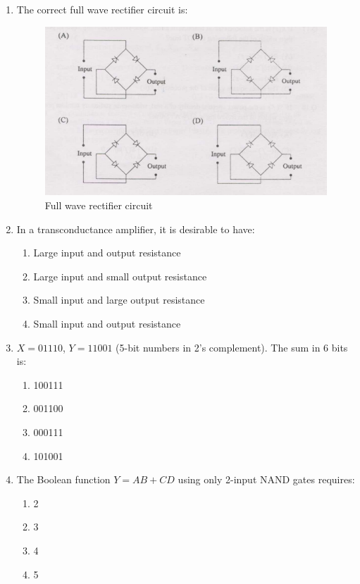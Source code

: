 \documentclass[journal,12pt,onecolumn]{IEEEtran}
\theoremstyle{remark}
\begin{document}
\begin{enumerate}
\item The correct full wave rectifier circuit is: 
\hfill{}

\begin{figure}[H]
    \centering
    \includegraphics[width=0.8\linewidth]{Q11.png}
    \caption{Full wave rectifier circuit}
    \label{fig:full_wave}
\end{figure}

\item In a transconductance amplifier, it is desirable to have: 
\hfill{}
\begin{enumerate}
    \item Large input and output resistance
    \item Large input and small output resistance
    \item Small input and large output resistance
    \item Small input and output resistance
\end{enumerate}

\item $ X = 01110 $, $ Y = 11001 $ (5-bit numbers in 2's complement). The sum in 6 bits is: 
\hfill{}
\begin{multicols}{4}

\begin{enumerate}
    \item 100111
    \item 001100
    \item 000111
    \item 101001
\end{enumerate}
\end{multicols}

\item The Boolean function $ Y = AB + CD $ using only 2-input NAND gates requires: 
\hfill{}
\begin{multicols}{4}
\begin{enumerate}
    \item 2
    \item 3
    \item 4
    \item 5
\end{enumerate}
\end{multicols}



\end{enumerate}
\end{document}

